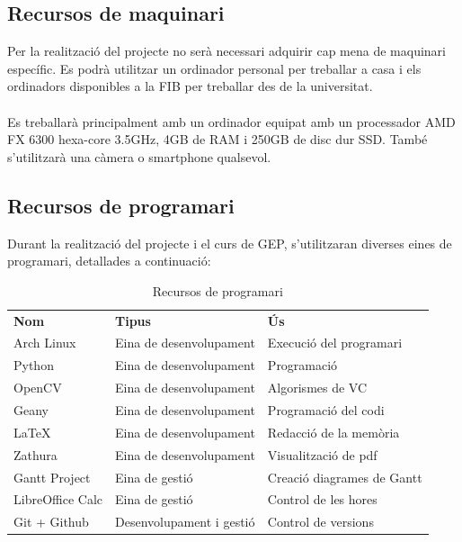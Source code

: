 	\subsection{Recursos de maquinari}
		Per la realització del projecte no serà necessari adquirir cap mena de maquinari específic. Es podrà utilitzar un ordinador personal per treballar a casa i els ordinadors disponibles a la FIB per
		treballar des de la universitat.\\\\
		Es treballarà principalment amb un ordinador equipat amb un processador AMD FX 6300 hexa-core 3.5GHz, 4GB de RAM i 250GB de disc dur SSD. També s'utilitzarà una càmera o smartphone qualsevol.
	\subsection{Recursos de programari}
	Durant la realització del projecte i el curs de GEP, s'utilitzaran diverses eines de programari, detallades a continuació:\\
	\begin{table}[H]
		\begin{center}
			\begin{tabular}{l !{\vrule width -1pt}p{5cm} !{\vrule width -1pt}p{5cm}}
			\textbf{Nom} & \textbf{Tipus} & \textbf{Ús} \\
			Arch Linux & Eina de desenvolupament & Execució del programari \\
			Python & Eina de desenvolupament & Programació \\
			OpenCV & Eina de desenvolupament & Algorismes de VC \\
			Geany & Eina de desenvolupament & Programació del codi \\
			\LaTeX & Eina de desenvolupament & Redacció de la memòria \\
			Zathura & Eina de desenvolupament & Visualització de pdf \\
			Gantt Project & Eina de gestió & Creació diagrames de Gantt \\
			LibreOffice Calc & Eina de gestió & Control de les hores \\
			Git + Github & Desenvolupament i gestió & Control de versions \\
			\end{tabular}
		\end{center}
		\caption{Recursos de programari}
	\end{table}
	
